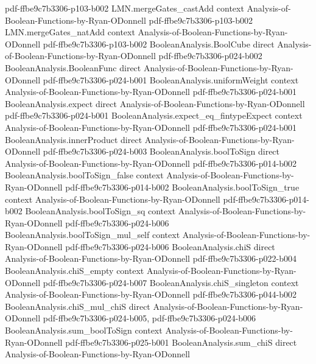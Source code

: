 \begin{theorem}
  {pdf-ffbe9c7b3306-p103-b002}
\proofstep
  {LMN.mergeGates_castAdd}
  {context}
  {Analysis-of-Boolean-Functions-by-Ryan-ODonnell}
  {pdf-ffbe9c7b3306-p103-b002}
\proofstep
  {LMN.mergeGates_natAdd}
  {context}
  {Analysis-of-Boolean-Functions-by-Ryan-ODonnell}
  {pdf-ffbe9c7b3306-p103-b002}
\proofstep
  {BooleanAnalysis.BoolCube}
  {direct}
  {Analysis-of-Boolean-Functions-by-Ryan-ODonnell}
  {pdf-ffbe9c7b3306-p024-b002}
\proofstep
  {BooleanAnalysis.BooleanFunc}
  {direct}
  {Analysis-of-Boolean-Functions-by-Ryan-ODonnell}
  {pdf-ffbe9c7b3306-p024-b001}
\proofstep
  {BooleanAnalysis.uniformWeight}
  {context}
  {Analysis-of-Boolean-Functions-by-Ryan-ODonnell}
  {pdf-ffbe9c7b3306-p024-b001}
\proofstep
  {BooleanAnalysis.expect}
  {direct}
  {Analysis-of-Boolean-Functions-by-Ryan-ODonnell}
  {pdf-ffbe9c7b3306-p024-b001}
\proofstep
  {BooleanAnalysis.expect_eq_fintypeExpect}
  {context}
  {Analysis-of-Boolean-Functions-by-Ryan-ODonnell}
  {pdf-ffbe9c7b3306-p024-b001}
\proofstep
  {BooleanAnalysis.innerProduct}
  {direct}
  {Analysis-of-Boolean-Functions-by-Ryan-ODonnell}
  {pdf-ffbe9c7b3306-p024-b003}
\proofstep
  {BooleanAnalysis.boolToSign}
  {direct}
  {Analysis-of-Boolean-Functions-by-Ryan-ODonnell}
  {pdf-ffbe9c7b3306-p014-b002}
\proofstep
  {BooleanAnalysis.boolToSign_false}
  {context}
  {Analysis-of-Boolean-Functions-by-Ryan-ODonnell}
  {pdf-ffbe9c7b3306-p014-b002}
\proofstep
  {BooleanAnalysis.boolToSign_true}
  {context}
  {Analysis-of-Boolean-Functions-by-Ryan-ODonnell}
  {pdf-ffbe9c7b3306-p014-b002}
\proofstep
  {BooleanAnalysis.boolToSign_sq}
  {context}
  {Analysis-of-Boolean-Functions-by-Ryan-ODonnell}
  {pdf-ffbe9c7b3306-p024-b006}
\proofstep
  {BooleanAnalysis.boolToSign_mul_self}
  {context}
  {Analysis-of-Boolean-Functions-by-Ryan-ODonnell}
  {pdf-ffbe9c7b3306-p024-b006}
\proofstep
  {BooleanAnalysis.chiS}
  {direct}
  {Analysis-of-Boolean-Functions-by-Ryan-ODonnell}
  {pdf-ffbe9c7b3306-p022-b004}
\proofstep
  {BooleanAnalysis.chiS_empty}
  {context}
  {Analysis-of-Boolean-Functions-by-Ryan-ODonnell}
  {pdf-ffbe9c7b3306-p024-b007}
\proofstep
  {BooleanAnalysis.chiS_singleton}
  {context}
  {Analysis-of-Boolean-Functions-by-Ryan-ODonnell}
  {pdf-ffbe9c7b3306-p044-b002}
\proofstep
  {BooleanAnalysis.chiS_mul_chiS}
  {direct}
  {Analysis-of-Boolean-Functions-by-Ryan-ODonnell}
  {pdf-ffbe9c7b3306-p024-b005,
    pdf-ffbe9c7b3306-p024-b006}
\proofstep
  {BooleanAnalysis.sum_boolToSign}
  {context}
  {Analysis-of-Boolean-Functions-by-Ryan-ODonnell}
  {pdf-ffbe9c7b3306-p025-b001}
\proofstep
  {BooleanAnalysis.sum_chiS}
  {direct}
  {Analysis-of-Boolean-Functions-by-Ryan-ODonnell}

\end{theorem}
